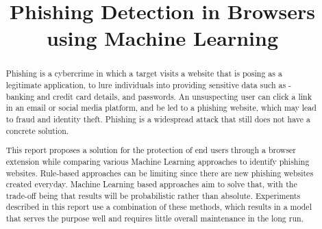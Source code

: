 \documentclass[conference]{IEEEtran}
\begin{document}
\title{Phishing Detection in Browsers \linebreak using Machine Learning\\
}

\author{
    \and

}

\maketitle

\begin{abstract}

    Phishing is a cybercrime in which a target visits a website that is posing as a legitimate application, to lure individuals into providing sensitive data such as - banking and credit card details, and passwords.
    An unsuspecting user can click a link in an email or social media platform, and be led to a phishing website, which may lead to fraud and identity theft.
    Phishing is a widespread attack that still does not have a concrete solution.
    \par This report proposes a solution for the protection of end users through a browser extension while comparing various Machine Learning approaches to identify phishing websites.
    Rule-based approaches can be limiting since there are new phishing websites created everyday. Machine Learning based approaches aim to solve that, with the trade-off being that results will be probabilistic rather than absolute. Experiments described in this report use a combination of these methods, which results in a model that serves the purpose well and requires little overall maintenance in the long run.
\end{abstract}
\end{document}
